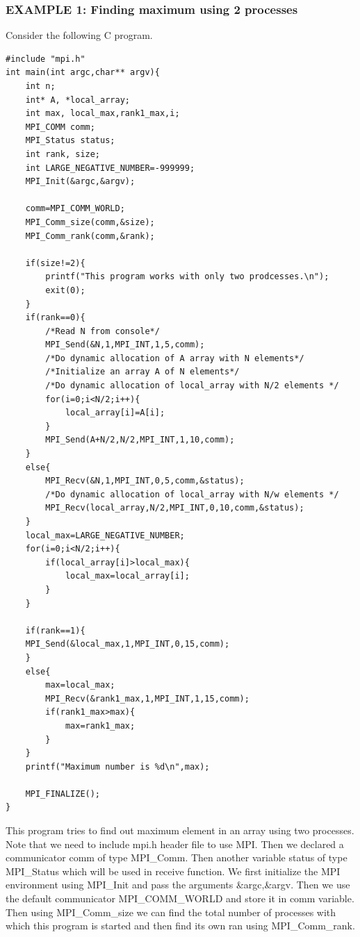 \documentclass[12pt]{article}
\begin{document}
\subsubsection{EXAMPLE 1: Finding maximum using 2 processes}
Consider the following C program.
\begin{lstlisting}
#include "mpi.h"
int main(int argc,char** argv){
    int n;
    int* A, *local_array;
    int max, local_max,rank1_max,i;
    MPI_COMM comm;
    MPI_Status status;
    int rank, size;
    int LARGE_NEGATIVE_NUMBER=-999999;
    MPI_Init(&argc,&argv);

    comm=MPI_COMM_WORLD;
    MPI_Comm_size(comm,&size);
    MPI_Comm_rank(comm,&rank);

    if(size!=2){
        printf("This program works with only two prodcesses.\n");
        exit(0);
    }
    if(rank==0){
        /*Read N from console*/
        MPI_Send(&N,1,MPI_INT,1,5,comm);
        /*Do dynamic allocation of A array with N elements*/
        /*Initialize an array A of N elements*/
        /*Do dynamic allocation of local_array with N/2 elements */
        for(i=0;i<N/2;i++){
            local_array[i]=A[i];
        }
        MPI_Send(A+N/2,N/2,MPI_INT,1,10,comm);
    }
    else{
        MPI_Recv(&N,1,MPI_INT,0,5,comm,&status);
        /*Do dynamic allocation of local_array with N/w elements */
        MPI_Recv(local_array,N/2,MPI_INT,0,10,comm,&status);
    }
    local_max=LARGE_NEGATIVE_NUMBER;
    for(i=0;i<N/2;i++){
        if(local_array[i]>local_max){
            local_max=local_array[i];
        }
    }

    if(rank==1){
    MPI_Send(&local_max,1,MPI_INT,0,15,comm);
    }
    else{
        max=local_max;
        MPI_Recv(&rank1_max,1,MPI_INT,1,15,comm);
        if(rank1_max>max){
            max=rank1_max;
        }
    }
    printf("Maximum number is %d\n",max);

    MPI_FINALIZE();
}
\end{lstlisting}
This program tries to find out maximum element in an array using two processes. Note that we need to include mpi.h header file to use MPI. Then we declared a communicator comm of type MPI\_Comm. Then another variable status of type MPI\_Status which will be used in receive function. We first initialize the MPI environment using MPI\_Init and pass the arguments \&argc,\&argv. Then we use the default communicator MPI\_COMM\_WORLD and store it in comm variable. Then using MPI\_Comm\_size we can find the total number of processes with which this program is started and then find its own ran using MPI\_Comm\_rank.
\end{document}

